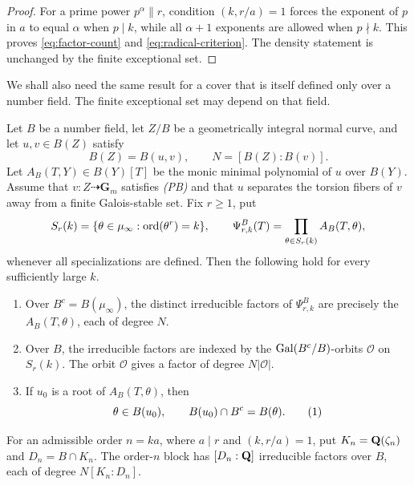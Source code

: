 \begin{proof}
For a prime power $p^\alpha\parallel r$, condition
$(k,r/a)=1$ forces the exponent of $p$ in $a$ to equal $\alpha$ when
$p\mid k$, while all $\alpha+1$ exponents are allowed when $p\nmid k$.
This proves \eqref{eq:factor-count} and \eqref{eq:radical-criterion}.
The density statement is unchanged by the finite exceptional set.
\end{proof}

We shall also need the same result for a cover that is itself defined
only over a number field.  The finite exceptional set may depend on
that field.

\begin{theorem}
\label{thm:kummer-torsion-number-field}
Let $B$ be a number field, let $Z/B$ be a geometrically integral normal
curve, and let $u,v\in B(Z)$ satisfy
\[
 B(Z)=B(u,v),\qquad N=[B(Z):B(v)].
\]
Let $A_B(T,Y)\in B(Y)[T]$ be the monic minimal polynomial of $u$ over
$B(Y)$.  Assume that $v:Z\dashrightarrow\mathbf G_m$ satisfies
\emph{(PB)} and that $u$ separates the torsion fibers of $v$ away from
a finite Galois-stable set.  Fix $r\ge1$, put
\[
 S_r(k)=\{\theta\in\mu_\infty:\operatorname{ord}(\theta^r)=k\},\qquad
 \Psi^B_{r,k}(T)=\prod_{\theta\in S_r(k)}A_B(T,\theta),
\]
whenever all specializations are defined.  Then the following hold for
every sufficiently large $k$.

\begin{enumerate}[label=\textup{(\roman*)}]
\item Over $B^c=B(\mu_\infty)$, the distinct irreducible factors of
      $\Psi^B_{r,k}$ are precisely the $A_B(T,\theta)$, each of degree
      $N$.
\item Over $B$, the irreducible factors are indexed by the
      $\operatorname{Gal}(B^c/B)$-orbits $\mathcal O$ on $S_r(k)$.  The orbit
      $\mathcal O$ gives a factor of degree $N|\mathcal O|$.
\item If $u_0$ is a root of $A_B(T,\theta)$, then
      \[
       \theta\in B(u_0),\qquad
       B(u_0)\cap B^c=B(\theta).
       \numberthis\label{eq:B-intersection}
      \]
\end{enumerate}
For an admissible order $n=ka$, where $a\mid r$ and $(k,r/a)=1$, put
$K_n=\mathbf Q(\zeta_n)$ and $D_n=B\cap K_n$.  The order-$n$ block has
$[D_n:\mathbf Q]$ irreducible factors over $B$, each of degree
$N[K_n:D_n]$.
\end{theorem}

